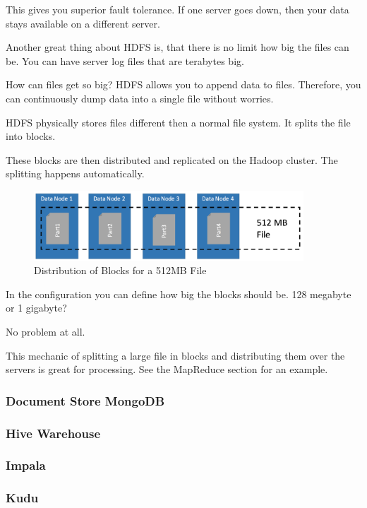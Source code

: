 \documentclass[12pt]{scrartcl} %
\begin{document}
This gives you superior fault tolerance. If one server goes down, then your data stays available on a different server.

Another great thing about HDFS is, that there is no limit how big the files can be. You can have server log files that are terabytes big.

How can files get so big? HDFS allows you to append data to files. Therefore, you can continuously dump data into a single file without worries.

HDFS physically stores files different then a normal file system. It splits the file into blocks.

These blocks are then distributed and replicated on the Hadoop cluster. The splitting happens automatically.

\begin{figure}[htbp]
  \centering
     \includegraphics[width=0.9\textwidth]{images/HDFS-Distributed-FileSystem}
  \caption{Distribution of Blocks for a 512MB File}
  \label{fig:Bild1}
\end{figure}

In the configuration you can define how big the blocks should be. 128 megabyte or 1 gigabyte?

No problem at all.

This mechanic of splitting a large file in blocks and distributing them over the servers is great for processing.
See the MapReduce section for an example.

\subsubsection{Document Store MongoDB}
\subsubsection{Hive Warehouse}
\subsubsection{Impala}
\subsubsection{Kudu}
\end{document}
